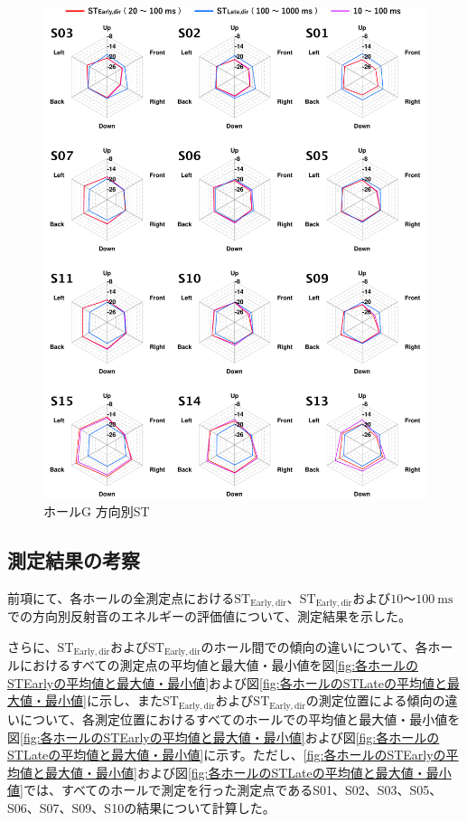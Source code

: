 \documentclass[11pt,a4j]{jreport}
\begin{document}
\newpage

\begin{figure}[H]
  \centering
  \includegraphics[scale=.77]{images/realHallDirSt/allPoint/reshaped/gRightPage.pdf}
  \caption{ホールG 方向別ST}
  \label{fig:ホールG 方向別ST}
\end{figure}

\clearpage

\subsection*{測定結果の考察}

前項にて、各ホールの全測定点における$\mathrm{ST_{Early,dir}}$、$\mathrm{ST_{Early,dir}}$および$10$～$\SI{100}{\ms}$での方向別反射音のエネルギーの評価値について、測定結果を示した。

さらに、$\mathrm{ST_{Early,dir}}$および$\mathrm{ST_{Early,dir}}$のホール間での傾向の違いについて、各ホールにおけるすべての測定点の平均値と最大値・最小値を図\ref{fig:各ホールのSTEarlyの平均値と最大値・最小値}および図\ref{fig:各ホールのSTLateの平均値と最大値・最小値}に示し、また$\mathrm{ST_{Early,dir}}$および$\mathrm{ST_{Early,dir}}$の測定位置による傾向の違いについて、各測定位置におけるすべてのホールでの平均値と最大値・最小値を図\ref{fig:各ホールのSTEarlyの平均値と最大値・最小値}および図\ref{fig:各ホールのSTLateの平均値と最大値・最小値}に示す。ただし、\ref{fig:各ホールのSTEarlyの平均値と最大値・最小値}および図\ref{fig:各ホールのSTLateの平均値と最大値・最小値}では、すべてのホールで測定を行った測定点であるS01、S02、S03、S05、S06、S07、S09、S10の結果について計算した。
\end{document}
